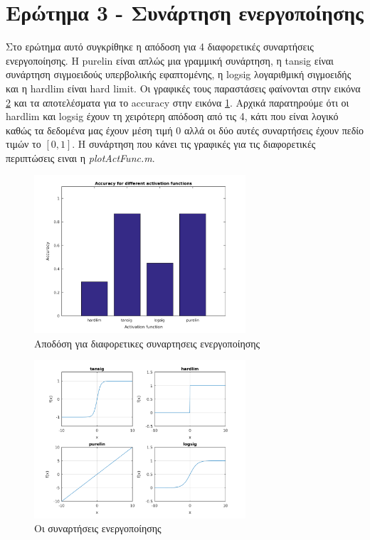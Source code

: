 \documentclass[12pt]{article}
\begin{document}
\section*{Ερώτημα 3 - Συνάρτηση ενεργοποίησης}
Στο ερώτημα αυτό συγκρίθηκε η απόδοση για 4 διαφορετικές συναρτήσεις ενεργοποίησης. Η purelin είναι απλώς μια γραμμική συνάρτηση, η tansig είναι συνάρτηση σιγμοειδούς υπερβολικής εφαπτομένης, η logsig λογαριθμική σιγμοειδής και η hardlim είναι hard limit. Οι γραφικές τους παραστάσεις φαίνονται στην εικόνα \ref{fig:3.Act-funcs} και τα αποτελέσματα για το accuracy στην εικόνα \ref{fig:3.Act-func-acc}. Αρχικά παρατηρούμε ότι οι hardlim και logsig έχουν τη χειρότερη απόδοση από τις 4, κάτι που είναι λογικό καθώς τα δεδομένα μας έχουν μέση τιμή 0 αλλά οι δύο αυτές συναρτήσεις έχουν πεδίο τιμών το $[0,1]$. Η συνάρτηση που κάνει τις γραφικές για τις διαφορετικές περιπτώσεις ειναι η \textit{plotActFunc.m}.

\begin{figure}[H]
	 		\centering
			\includegraphics[width=0.7\textwidth]{fakelos/6a.actFunc-lvl1-30-lvl2-0.png}
			\caption{Αποδόση για διαφορετικες συναρτησεις ενεργοποίησης} 	  
			\label{fig:3.Act-func-acc}
		\end{figure}

\begin{figure}[H]
	 		\centering
			\includegraphics[width=0.7\textwidth]{fakelos/actFuncs.png}
			\caption{Οι συναρτήσεις ενεργοποίησης} 	  
			\label{fig:3.Act-funcs}
		\end{figure}
				
\end{document}
